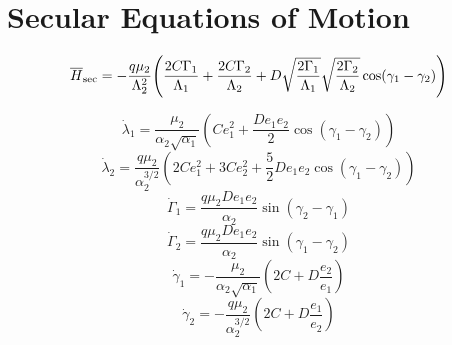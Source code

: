 \documentclass[12pt]{article}
\DeclarePairedDelimiter{\p}{(}{)}
\begin{document}
\section{Secular Equations of Motion}

\begin{equation}
  \overline H_{\rm sec}
  = -\frac{q\mu_2}{\Lambda_2^2}
  \p*{
    \frac{2C\Gamma_1}{\Lambda_1}
    +\frac{2C\Gamma_2}{\Lambda_2}
    +D\sqrt{\frac{2\Gamma_1}{\Lambda_1}}
    \sqrt{\frac{2\Gamma_2}{\Lambda_2}}
    \cos(\gamma_1-\gamma_2)
    }
\end{equation}

\begin{equation}
\dot{\lambda}_{1}=\frac{ \mu_{2}}{\alpha_{2} \sqrt{\alpha_{1}}}\left(C e_{1}^{2}+\frac{D e_{1} e_{2}}{2} \cos \left(\gamma_{1}-\gamma_{2}\right)\right) 
\end{equation}
\begin{equation}
\dot{\lambda}_{2}=\frac{q \mu_{2}}{\alpha_{2}^{3 / 2}}\left(2 C e_{1}^{2}+3 C e_{2}^{2}+\frac{5}{2} De_{1}e_2 \cos \left(\gamma_1-\gamma_2\right)\right)
\end{equation}
\begin{equation}
\dot{\Gamma}_{1}=\frac{q \mu_{2} D e_{1} e_{2}}{\alpha_{2}} \sin \left(\gamma_{2}-\gamma_{1}\right)
\end{equation}
\begin{equation}
\dot{\Gamma}_{2}=\frac{q \mu_{2} D e_{1} e_{2}}{\alpha_{2}} \sin \left(\gamma_{1}-\gamma_{2}\right) 
\end{equation}
\begin{equation}
\dot{\gamma}_{1}=-\frac{ \mu_{2}}{\alpha_{2} \sqrt{\alpha_{1}}}\left(2 C+D \frac{e_{2}}{e_{1}}\right) 
\end{equation}
\begin{equation}
\dot{\gamma}_{2}=-\frac{q \mu_{2}}{\alpha_{2}^{3 / 2}}\left(2 C+D \frac{e_{1}}{e_{2}}\right)
\end{equation}
\end{document}
